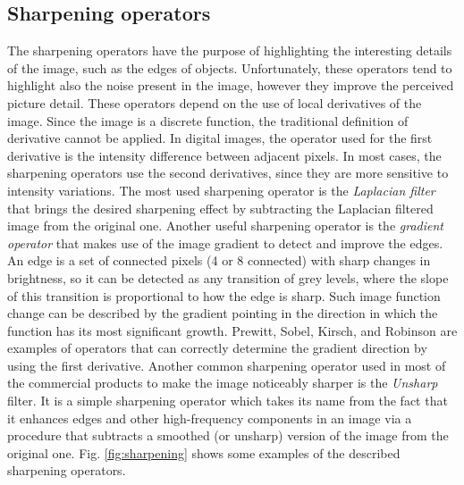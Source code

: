 \documentclass[final,a4paper,12pt,english]{UnicaPhdThesis3}
\begin{document}
\subsection{Sharpening operators} %
The sharpening operators have the purpose of highlighting the interesting details of the image, such as the edges of objects. Unfortunately, these operators tend to highlight also the noise present in the image, however they improve the perceived picture detail. These operators depend on the use of local derivatives of the image. Since the image is a discrete function, the traditional definition of derivative cannot be applied.
In digital images, the operator used for the first derivative is the intensity difference between adjacent pixels. In most cases, the sharpening operators use the second derivatives, since they are more sensitive to intensity variations. The most used sharpening operator is the \textit{Laplacian filter} that brings the desired sharpening effect by subtracting the Laplacian filtered image from the original one. Another useful sharpening operator is the \textit{gradient operator} that makes use of the image gradient to detect and improve the edges. An edge is a set of connected pixels (4 or 8 connected) with sharp changes in brightness, so it can be detected as any transition of grey levels, where the slope of this transition is proportional to how the edge is sharp. Such image function change can be described by the gradient pointing in the direction in which the function has its most significant growth. Prewitt, Sobel, Kirsch, and Robinson are examples of operators that can correctly determine the gradient direction by using the first derivative. Another common sharpening operator used in most of the commercial products to make the image noticeably sharper is the \textit{Unsharp} filter. It is a simple sharpening operator which takes its name from the fact that it enhances edges and other high-frequency components in an image via a procedure that subtracts a smoothed (or unsharp) version of the image from the original one. Fig. \ref{fig:sharpening} shows some examples of the described sharpening operators.
\end{document}
